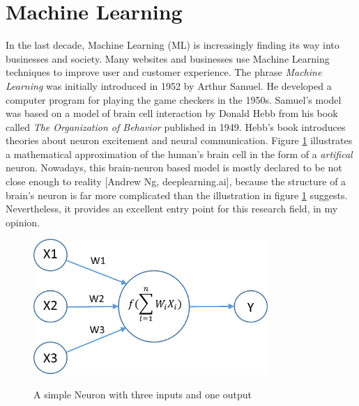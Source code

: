 \section{Machine Learning}
In the last decade, Machine Learning (ML) is increasingly finding its way into businesses and society. Many websites and businesses use Machine Learning techniques to improve user and customer experience. The phrase \textit{Machine Learning} was initially introduced in 1952 by Arthur Samuel. He developed a computer program for playing the game checkers in the 1950s. Samuel's model was based on a model of brain cell interaction by Donald Hebb from his book called \textit{The Organization of Behavior} published in 1949. Hebb's book introduces theories about neuron excitement and neural communication. Figure \ref{neuron} illustrates a mathematical approximation of the human's brain cell in the form of a \textit{artifical} neuron. Nowadays, this brain-neuron based model is mostly declared to be not close enough to reality [Andrew Ng, deeplearning.ai], because the structure of a brain's neuron is far more complicated than the illustration in figure \ref{neuron} suggests. Nevertheless, it provides an excellent entry point for this research field, in my opinion. 

\begin{figure}
  \begin{center}
  \includegraphics[width=3.5in]{photos/neuron}\\
  \caption{A simple Neuron with three inputs and one output \cite{neuron}}\label{neuron}
  \end{center}
\end{figure}
 
